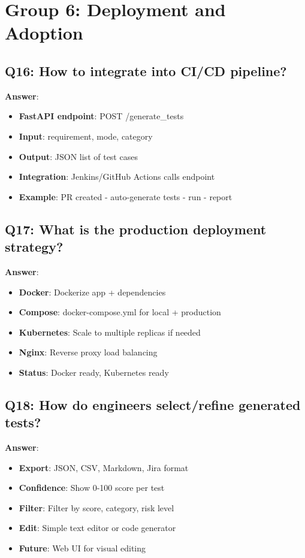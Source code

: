 \documentclass[12pt,a4paper]{report}
\begin{document}
\section{Group 6: Deployment and Adoption}

\subsection{Q16: How to integrate into CI/CD pipeline?}

\textbf{Answer}:
\begin{itemize}
    \item \textbf{FastAPI endpoint}: POST /generate\_tests
    \item \textbf{Input}: requirement, mode, category
    \item \textbf{Output}: JSON list of test cases
    \item \textbf{Integration}: Jenkins/GitHub Actions calls endpoint
    \item \textbf{Example}: PR created - auto-generate tests - run - report
\end{itemize}

\subsection{Q17: What is the production deployment strategy?}

\textbf{Answer}:
\begin{itemize}
    \item \textbf{Docker}: Dockerize app + dependencies
    \item \textbf{Compose}: docker-compose.yml for local + production
    \item \textbf{Kubernetes}: Scale to multiple replicas if needed
    \item \textbf{Nginx}: Reverse proxy load balancing
    \item \textbf{Status}: Docker ready, Kubernetes ready
\end{itemize}

\subsection{Q18: How do engineers select/refine generated tests?}

\textbf{Answer}:
\begin{itemize}
    \item \textbf{Export}: JSON, CSV, Markdown, Jira format
    \item \textbf{Confidence}: Show 0-100 score per test
    \item \textbf{Filter}: Filter by score, category, risk level
    \item \textbf{Edit}: Simple text editor or code generator
    \item \textbf{Future}: Web UI for visual editing
\end{itemize}
\end{document}
